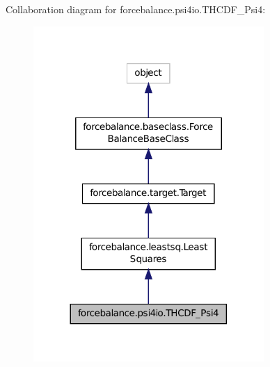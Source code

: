 Collaboration diagram for forcebalance.\-psi4io.\-T\-H\-C\-D\-F\-\_\-\-Psi4\-:\nopagebreak
\begin{figure}[H]
\begin{center}
\leavevmode
\includegraphics[width=248pt]{classforcebalance_1_1psi4io_1_1THCDF__Psi4__coll__graph}
\end{center}
\end{figure}
